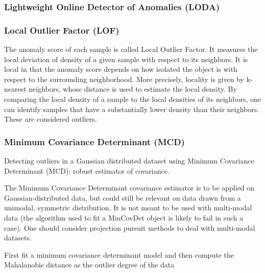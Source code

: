 \subsubsection{Lightweight Online Detector of Anomalies (LODA)}
\cite{pevny2016loda}

\subsubsection{Local Outlier Factor (LOF)}
The anomaly score of each sample is called Local Outlier Factor. It measures the local deviation of density of a given sample with respect to its neighbors. It is local in that the anomaly score depends on how isolated the object is with respect to the surrounding neighborhood. More precisely, locality is given by k-nearest neighbors, whose distance is used to estimate the local density. By comparing the local density of a sample to the local densities of its neighbors, one can identify samples that have a substantially lower density than their neighbors. These are considered outliers.
\cite{breunig2000lof}

\subsubsection{Minimum Covariance Determinant (MCD)}
Detecting outliers in a Gaussian distributed dataset using Minimum Covariance Determinant (MCD): robust estimator of covariance.

The Minimum Covariance Determinant covariance estimator is to be applied on Gaussian-distributed data, but could still be relevant on data drawn from a unimodal, symmetric distribution. It is not meant to be used with multi-modal data (the algorithm used to fit a MinCovDet object is likely to fail in such a case). One should consider projection pursuit methods to deal with multi-modal datasets.

First fit a minimum covariance determinant model and then compute the Mahalanobis distance as the outlier degree of the data
\cite{rousseeuw1999mcd}
\cite{hardin2004mcd}

